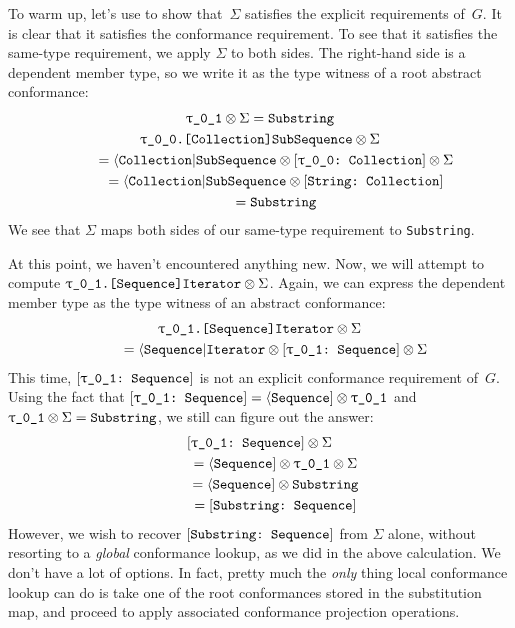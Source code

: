 \documentclass[../generics]{subfiles}
\begin{document}
\begin{example}
To warm up, let's use  to show that~$\Sigma$ satisfies the explicit requirements of~$G$. It is clear that it satisfies the conformance requirement. To see that it satisfies the same-type requirement, we apply $\Sigma$ to both sides. The right-hand side is a dependent member type, so we write it as the type witness of a root abstract conformance:
\begin{gather*}
\rU \otimes \Sigma = \texttt{Substring}\\
\texttt{\rT.[Collection]SubSequence} \otimes \Sigma\\
\qquad {} = \ASubSequence \otimes \rTCollection \otimes \Sigma\\
\qquad {} = \ASubSequence \otimes \StringCollection\\
\qquad {} = \texttt{Substring}
\end{gather*}
We see that $\Sigma$ maps both sides of our same-type requirement to \texttt{Substring}.

At this point, we haven't encountered anything new. Now, we will attempt to compute $\texttt{\rU.[Sequence]Iterator} \otimes \Sigma$. Again, we can express the dependent member type as the type witness of an abstract conformance:
\begin{gather*}
\texttt{\rU.[Sequence]Iterator} \otimes \Sigma \\
\qquad {} = \AIterator \otimes \rUSequence \otimes \Sigma
\end{gather*}
This time, $\rUSequence$ is not an explicit conformance requirement of~$G$. Using the fact that $\rUSequence=\Proto{Sequence}\otimes\rU$ and $\rU\otimes \Sigma=\texttt{Substring}$, we still can figure out the answer:
\begin{gather*}
\rUSequence\otimes \Sigma\\
\qquad {} = \Proto{Sequence} \otimes \rU \otimes \Sigma\\
\qquad {} = \Proto{Sequence} \otimes \texttt{Substring}\\
\qquad {} = \SubstringSequence
\end{gather*}
However, we wish to recover $[\texttt{Substring:~Sequence}]$ from $\Sigma$ alone, without resorting to a \emph{global} conformance lookup, as we did in the above calculation. We don't have a lot of options. In fact, pretty much the \emph{only} thing local conformance lookup can do is take one of the root conformances stored in the substitution map, and proceed to apply associated conformance projection operations.


\end{example}
\end{document}
